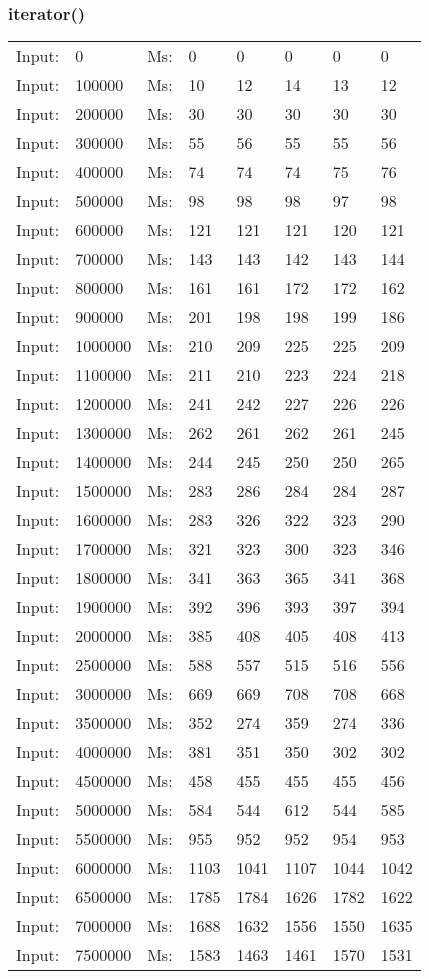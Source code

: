 \documentclass[11pt,a4paper]{report}
\begin{document}
\begin{tiny}
\subsubsection*{iterator()}
\begin{tabular}{l l ||l  l  l  l  l  l}
Input:&0&Ms:&0&0&0&0&0\\
Input:&100000&Ms:&10&12&14&13&12\\
Input:&200000&Ms:&30&30&30&30&30\\
Input:&300000&Ms:&55&56&55&55&56\\
Input:&400000&Ms:&74&74&74&75&76\\
Input:&500000&Ms:&98&98&98&97&98\\
Input:&600000&Ms:&121&121&121&120&121\\
Input:&700000&Ms:&143&143&142&143&144\\
Input:&800000&Ms:&161&161&172&172&162\\
Input:&900000&Ms:&201&198&198&199&186\\
Input:&1000000&Ms:&210&209&225&225&209\\
Input:&1100000&Ms:&211&210&223&224&218\\
Input:&1200000&Ms:&241&242&227&226&226\\
Input:&1300000&Ms:&262&261&262&261&245\\
Input:&1400000&Ms:&244&245&250&250&265\\
Input:&1500000&Ms:&283&286&284&284&287\\
Input:&1600000&Ms:&283&326&322&323&290\\
Input:&1700000&Ms:&321&323&300&323&346\\
Input:&1800000&Ms:&341&363&365&341&368\\
Input:&1900000&Ms:&392&396&393&397&394\\
Input:&2000000&Ms:&385&408&405&408&413\\
Input:&2500000&Ms:&588&557&515&516&556\\
Input:&3000000&Ms:&669&669&708&708&668\\
Input:&3500000&Ms:&352&274&359&274&336\\
Input:&4000000&Ms:&381&351&350&302&302\\
Input:&4500000&Ms:&458&455&455&455&456\\
Input:&5000000&Ms:&584&544&612&544&585\\
Input:&5500000&Ms:&955&952&952&954&953\\
Input:&6000000&Ms:&1103&1041&1107&1044&1042\\
Input:&6500000&Ms:&1785&1784&1626&1782&1622\\
Input:&7000000&Ms:&1688&1632&1556&1550&1635\\
Input:&7500000&Ms:&1583&1463&1461&1570&1531
\end{tabular}


\end{tiny}
\end{document}
